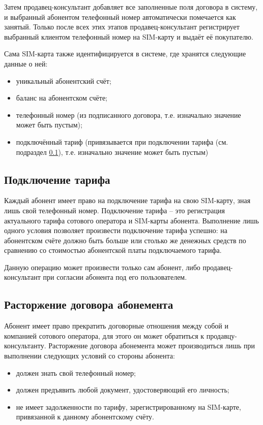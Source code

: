 Затем продавец-консультант добавляет все заполненные поля договора в систему, и выбранный абонентом телефонный номер автоматически помечается как занятый. Только после всех этих этапов продавец-консультант регистрирует выбранный клиентом телефонный номер на SIM-карту и выдаёт её покупателю.

Сама SIM-карта также идентифицируется в системе, где хранятся следующие данные о ней:
\begin{itemize}
    \item уникальный абонентский счёт;
    \item баланс на абонентском счёте;
    \item телефонный номер (из подписанного договора, т.е. изначально значение может быть пустым);
    \item подключённый тариф (привязывается при подключении тарифа (см. подраздел \ref{subsec:tariff-connection}), т.е. изначально значение может быть пустым)
\end{itemize}


\subsection{Подключение тарифа}\label{subsec:tariff-connection}


Каждый абонент имеет право на подключение тарифа на свою SIM-карту, зная лишь свой телефонный номер. Подключение тарифа -- это регистрация актуального тарифа сотового оператора и SIM-карты абонента. Выполнение лишь одного условия позволяет произвести подключение тарифа успешно: на абонентском счёте должно быть больше или столько же денежных средств по сравнению со стоимостью абонентской платы подключаемого тарифа.

Данную операцию может произвести только сам абонент, либо продавец-консультант при согласии абонента под его пользователем.


\subsection{Расторжение договора абонемента}


Абонент имеет право прекратить договорные отношения между собой и компанией сотового оператора, для этого он может обратиться к продавцу-консультанту. Расторжение договора абонемента может производиться лишь при выполнении следующих условий со стороны абонента:
\begin{itemize}
    \item должен знать свой телефонный номер;
    \item должен предъявить любой документ, удостоверяющий его личность;
    \item не имеет задолженности по тарифу, зарегистрированному на SIM-карте, привязанной к данному абонентскому счёту.
\end{itemize} 

